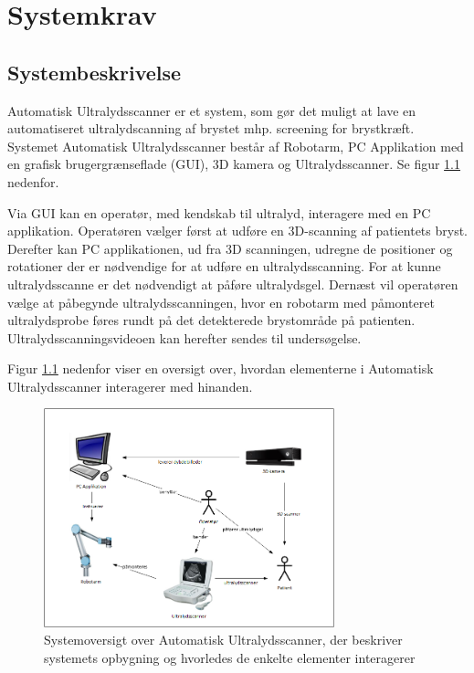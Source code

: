 \chapter{Systemkrav}\label{Systemkrav}
\section{Systembeskrivelse}
Automatisk Ultralydsscanner er et system, som gør det muligt at lave en automatiseret ultralydscanning af brystet mhp. screening for brystkræft. Systemet Automatisk Ultralydsscanner består af Robotarm, PC Applikation med en grafisk brugergrænseflade (GUI), 3D kamera og Ultralydsscanner. Se figur \ref{System} nedenfor. 

Via GUI kan en operatør, med kendskab til ultralyd, interagere med en PC applikation. Operatøren vælger først at udføre en 3D-scanning af patientets bryst. Derefter kan PC applikationen, ud fra 3D scanningen, udregne de positioner og rotationer der er nødvendige for at udføre en ultralydsscanning. For at kunne ultralydsscanne er det nødvendigt at påføre ultralydsgel. Dernæst vil operatøren vælge at påbegynde ultralydsscanningen, hvor en robotarm med påmonteret ultralydsprobe føres rundt på det detekterede brystområde på patienten. Ultralydsscanningsvideoen kan herefter sendes til undersøgelse.

Figur \ref{System} nedenfor viser en oversigt over, hvordan elementerne i Automatisk Ultralydsscanner interagerer med hinanden.
 
\begin{figure}[H]
    \centering
    \includegraphics[width=0.75\textwidth]{figurer/d/Kravspecifikation/Systembeskrivelse}
    \caption{Systemoversigt over Automatisk Ultralydsscanner, der beskriver systemets opbygning og hvorledes de enkelte elementer interagerer}
    \label{System}
\end{figure}

